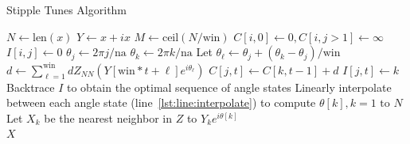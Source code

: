 \documentclass[runningheads]{llncs}
\begin{document}
\algrenewcommand\algorithmicindent{0.8em}%
\begin{algorithm}
  \caption{Stipple Tunes Algorithm}

  \begin{algorithmic}[1]
     
    \State $N \gets \text{len}(x)$ 
    \State $Y \gets x + ix$
    \State $M \gets \text{ceil}(N / \text{win})$
    \State $C[i, 0] \gets 0, C[i, j > 1] \gets \infty$ 
    \State $I[i, j] \gets 0$ 
            \State $\theta_j \gets 2 \pi j / \text{na}$
                \State $\theta_k \gets 2 \pi k / \text{na}$ \label{lst:line:interpolate}
                \State Let $\theta_{\ell} \gets \theta_j + (\theta_k-\theta_j)/\text{win}$ 
                \State $d \gets \sum_{\ell = 1}^{\text{win}} dZ_{NN}(Y[\text{win}*t + \ell] e^{i \theta_{\ell}})$ 
                    \State $C[j, t] \gets C[k, t-1] + d$ 
                    \State $I[j, t] \gets k$  
                \EndIf
            \EndFor
        \EndFor
    \EndFor \\
    \State Backtrace $I$ to obtain the optimal sequence of angle states
    \State Linearly interpolate between each angle state (line~\ref{lst:line:interpolate}) to compute $\theta[k], k = 1 \text{ to } N$ 
    \State Let $X_k$ be the nearest neighbor in $Z$ to $Y_k e^{i \theta[k]}$ \\
    \Return $X$
    \EndProcedure
  \end{algorithmic}
  \label{alg:stippletunes}
\end{algorithm}
\end{document}
